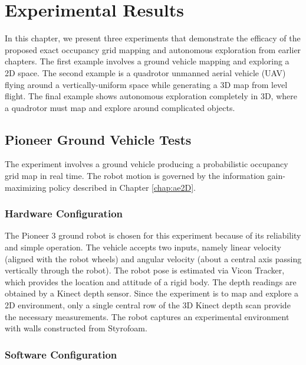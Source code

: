 
\chapter{Experimental Results}\label{chap:Experiments}

In this chapter, we present three experiments that demonstrate the efficacy of the proposed exact occupancy grid mapping and autonomous exploration from earlier chapters. The first example involves a ground vehicle mapping and exploring a 2D space. The second example is a quadrotor unmanned aerial vehicle (UAV) flying around a vertically-uniform space while generating a 3D map from level flight. The final example shows autonomous exploration completely in 3D, where a quadrotor must map and explore around complicated objects.

\section{Pioneer Ground Vehicle Tests}
\label{sec:PioneerNRL}

The experiment involves a ground vehicle producing a probabilistic occupancy grid map in real time. The robot motion is governed by the information gain-maximizing policy described in Chapter \ref{chap:ae2D}.


\subsection{Hardware Configuration}
The Pioneer 3 ground robot is chosen for this experiment because of its reliability and simple operation. The vehicle accepts two inputs, namely linear velocity (aligned with the robot wheels) and angular velocity (about a central axis passing vertically through the robot). The robot pose is estimated via Vicon Tracker, which provides the location and attitude of a rigid body. The depth readings are obtained by a Kinect depth sensor. Since the experiment is to map and explore a 2D environment, only a single central row of the 3D Kinect depth scan provide the necessary measurements. The robot captures an experimental environment with walls constructed from Styrofoam.

\subsection{Software Configuration}

